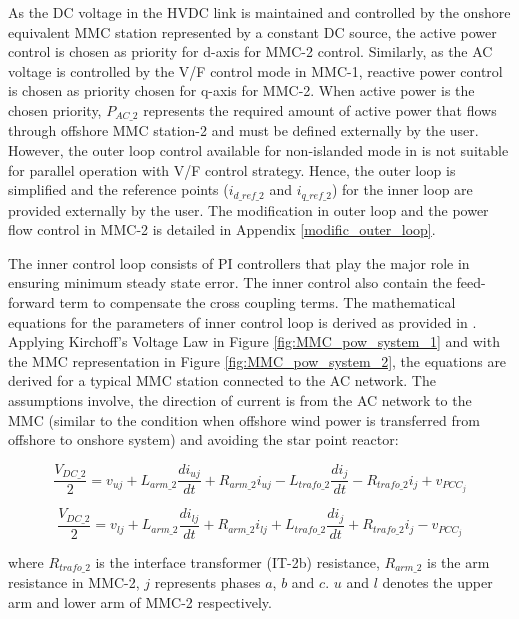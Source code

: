 As the \gls{DC} voltage in the \gls{HVDC} link is maintained and controlled by the onshore equivalent \gls{MMC} station represented by a constant \gls{DC} source, the active power control is chosen as priority for d-axis for \gls{MMC}-2 control. Similarly, as the \gls{AC} voltage is controlled by the V/F control mode in \gls{MMC}-1, reactive power control is chosen as priority chosen for q-axis for \gls{MMC}-2. When active power is the chosen priority, $P_{AC\_2}$ represents the required amount of active power that flows through offshore \gls{MMC} station-2 and must be defined externally by the user. However, the outer loop control available for non-islanded mode in \cite{vrana2013cigre} is not suitable for parallel operation with V/F control strategy. Hence, the outer loop is simplified and the reference points ($i_{d\_ref\_2}$ and $i_{q\_ref\_2}$) for the inner loop are provided externally by the user. The modification in outer loop and the power flow control in \gls{MMC}-2 is detailed in Appendix \ref{modific_outer_loop}.  


The inner control loop consists of \gls{PI} controllers that play the major role in ensuring minimum steady state error. The inner control also contain the feed-forward term to compensate the cross coupling terms. The mathematical equations for the parameters of inner control loop is derived as provided in \cite{saad2015modelisation}. Applying Kirchoff's Voltage Law in Figure \ref{fig:MMC_pow_system_1} and with the \gls{MMC} representation in Figure \ref{fig:MMC_pow_system_2}, the equations are derived for a typical \gls{MMC} station connected to the \gls{AC} network. The assumptions involve, the direction of current is from the \gls{AC} network to the \gls{MMC} (similar to the condition when offshore wind power is transferred from offshore to onshore system) and avoiding the star point reactor:

\begin{equation}
    \frac{V_{DC\_2}}{2} = v_{uj} + L_{arm\_2}\frac{di_{uj}}{dt} + R_{arm\_2}i_{uj} - L_{trafo\_2}\frac{di_{j}}{dt} - R_{trafo\_2}i_j + v_{PCC_j}
\end{equation}

\begin{equation}
    \frac{V_{DC\_2}}{2} = v_{lj} + L_{arm\_2}\frac{di_{lj}}{dt} + R_{arm\_2}i_{lj} + L_{trafo\_2}\frac{di_{j}}{dt} + R_{trafo\_2}i_j - v_{PCC_j}
\end{equation}

where $R_{trafo\_2}$ is the interface transformer (IT-2b) resistance, $R_{arm\_2}$ is the arm resistance in \gls{MMC}-2, $j$ represents phases $a$, $b$ and $c$. $u$ and $l$ denotes the upper arm and lower arm of \gls{MMC}-2 respectively.

